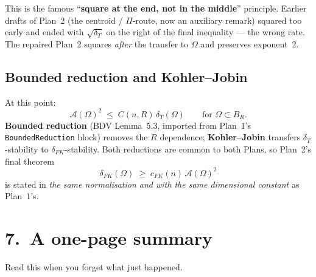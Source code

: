 \documentclass[11pt,a4paper]{article}
\newcommand{\Fr}{\mathcal{A}}
\newcommand{\deltaT}{\delta_T}
\newcommand{\deltaFK}{\delta_{FK}}
\begin{document}
This is the famous ``\textbf{square at the end, not in the middle}'' principle. Earlier drafts of Plan~2 (the centroid / $\Pi$-route, now an auxiliary remark) squared too early and ended with $\sqrt{\deltaT}$ on the right of the final inequality --- the wrong rate. The repaired Plan~2 squares \emph{after} the transfer to $\Omega$ and preserves exponent~2.

\subsection*{Bounded reduction and Kohler--Jobin}

At this point:
\[
\Fr(\Omega)^2 \;\le\; C(n, R)\, \deltaT(\Omega) \qquad \text{for $\Omega \subset B_R$.}
\]
\textbf{Bounded reduction} (BDV Lemma~5.3, imported from Plan~1's \texttt{BoundedReduction} block) removes the $R$ dependence; \textbf{Kohler--Jobin} transfers $\deltaT$-stability to $\deltaFK$-stability. Both reductions are common to both Plans, so Plan~2's final theorem
\[
\deltaFK(\Omega) \;\ge\; c_{FK}(n)\, \Fr(\Omega)^2
\]
is stated in \emph{the same normalisation and with the same dimensional constant} as Plan~1's.

\section*{7.\ A one-page summary}

Read this when you forget what just happened.
\end{document}
